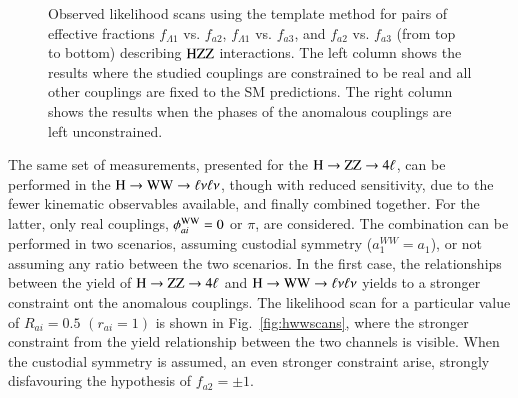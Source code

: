 \begin{enumerate}
\begin{figure}[!p]
\begin{center}
        \caption{
        Observed likelihood scans using the template method for pairs of effective fractions $f_{\Lambda1}$ vs. $f_{a2}$, 
        $f_{\Lambda1}$ vs. $f_{a3}$, and $f_{a2}$ vs. $f_{a3}$ (from top to bottom) describing $\mathrm{H}\mathrm{Z}\mathrm{Z}$ interactions. 
        The left column shows the results where the studied couplings are constrained to be real
        and all other couplings are fixed to the SM predictions.
        The right column shows the results when the phases of the anomalous couplings are left unconstrained. 
        \label{fig:results_ZZ_2D}
        }
\end{center}
\end{figure}

\end{enumerate}

The same set of measurements, presented for the $\mathrm{H}\to\mathrm{Z}\mathrm{Z}\to4\ell$, can be
performed in the $\mathrm{H}\to\mathrm{W}\mathrm{W}\to\ell\nu\ell\nu$, though with reduced sensitivity, due to
the fewer kinematic observables available, and finally combined
together. For the latter, only real couplings, $\phi_{ai}^{\mathrm{W}\mathrm{W}}=0$
or $\pi$, are considered. The combination can be performed in two
scenarios, assuming custodial symmetry ($a_1^{WW} = a_1$), or not
assuming any ratio between the two scenarios. In the first case, the
relationships between the yield of $\mathrm{H}\to\mathrm{Z}\mathrm{Z}\to4\ell$ and $\mathrm{H}\to\mathrm{W}\mathrm{W}\to\ell\nu\ell\nu$ yields to
a stronger constraint ont the anomalous couplings.
The likelihood scan for a particular value of $R_{ai}=0.5$ $(r_{ai} = 1)$
is shown in Fig.~\ref{fig:hwwscans}, where the stronger constraint from 
the yield relationship between the two channels is visible. When the custodial
symmetry is assumed, an even stronger constraint arise, strongly disfavouring 
the hypothesis of $f_{a2}=\pm1$.
%

